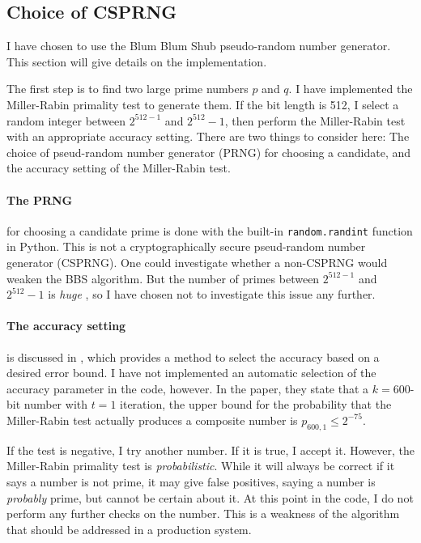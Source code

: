 \documentclass[a4paper,english,12pt]{article}
\begin{document}
\subsection{Choice of CSPRNG}
I have chosen to use the Blum Blum Shub \cite{bbs} pseudo-random number
generator. This section will give details on the implementation.

The first step is to find two large prime numbers $p$ and $q$. I have
implemented the Miller-Rabin \cite{miller.rabin} primality test to generate
them.
%
If the bit length is 512, I select a random integer between $2^{512-1}$ and
$2^{512}-1$, then perform the Miller-Rabin test with an appropriate accuracy
setting. There are two things to consider here: The choice of pseud-random
number generator (PRNG) for choosing a candidate, and the accuracy setting of
the Miller-Rabin test.

\paragraph{The PRNG} for choosing a candidate prime is done with the built-in
\texttt{random.randint} function in Python. This is not a cryptographically
secure pseud-random number generator (CSPRNG). One could investigate whether a
non-CSPRNG would weaken the BBS algorithm. But the number of primes between
$2^{512-1}$ and $2^{512}-1$ is \textit{huge} \cite{wiki:prime.counting}, so I
have chosen not to investigate this issue any further.

\paragraph{The accuracy setting} is discussed in \cite{damgaard1993average}, which
provides a method to select the accuracy based on a desired error bound. I have
not implemented an automatic selection of the accuracy parameter in the code,
however. In the paper, they state that a $k=600$-bit number with $t=1$
iteration, the upper bound for the probability that the Miller-Rabin test
actually produces a composite number is $p_{600, 1} \leqslant 2^{-75}$.

If the test is negative, I try another number. If it is true, I accept
it. However, the Miller-Rabin primality test is \textit{probabilistic}. While
it will always be correct if it says a number is not prime, it may give false
positives, saying a number is \textit{probably} prime, but cannot be certain
about it. At this point in the code, I do not perform any further checks on the
number. This is a weakness of the algorithm that should be addressed in a
production system.
\end{document}
